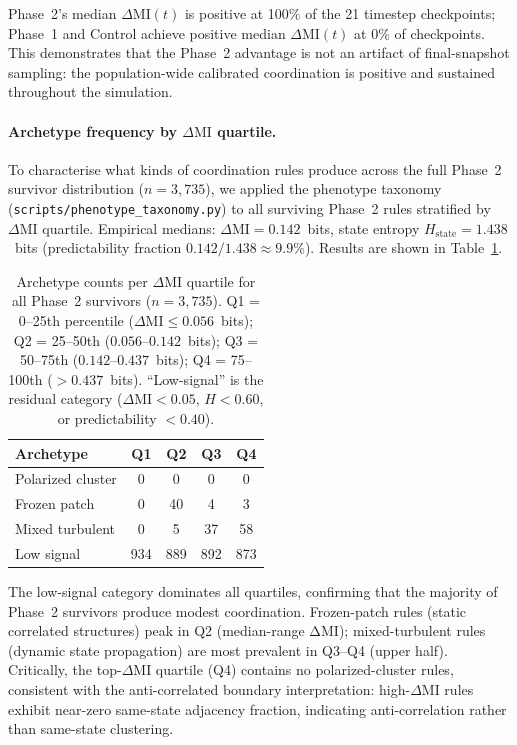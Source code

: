 \documentclass[letterpaper]{article}
\begin{document}
Phase~2's median $\Delta\mathrm{MI}(t)$ is positive at 100\% of the 21
timestep checkpoints; Phase~1 and Control achieve positive median
$\Delta\mathrm{MI}(t)$ at 0\% of checkpoints.  This demonstrates that
the Phase~2 advantage is not an artifact of final-snapshot sampling: the
population-wide calibrated coordination is positive and sustained
throughout the simulation.

\paragraph{Archetype frequency by $\Delta\mathrm{MI}$ quartile.}
To characterise what kinds of coordination rules produce across the full
Phase~2 survivor distribution ($n=3{,}735$), we applied the phenotype
taxonomy (\texttt{scripts/phenotype\_taxonomy.py}) to all surviving
Phase~2 rules stratified by $\Delta\mathrm{MI}$ quartile.
Empirical medians: $\Delta\mathrm{MI} = 0.142$~bits, state entropy
$H_{\mathrm{state}} = 1.438$~bits (predictability fraction
$0.142/1.438 \approx 9.9\%$).  Results are shown in
Table~\ref{tab:archetype_quartiles}.

\begin{table}[htbp]
\centering
\caption{Archetype counts per $\Delta\mathrm{MI}$ quartile for all Phase~2
survivors ($n=3{,}735$). Q1 = 0--25th percentile
($\Delta\mathrm{MI} \leq 0.056$~bits); Q2 = 25--50th ($0.056$--$0.142$~bits);
Q3 = 50--75th ($0.142$--$0.437$~bits); Q4 = 75--100th ($>0.437$~bits).
``Low-signal'' is the residual category ($\Delta\mathrm{MI} < 0.05$,
$H<0.60$, or predictability $< 0.40$).}
\label{tab:archetype_quartiles}
\begin{tabular}{lcccc}
\toprule
Archetype & Q1 & Q2 & Q3 & Q4 \\
\midrule
Polarized cluster  & 0 & 0 & 0 & 0 \\
Frozen patch       & 0 & 40 & 4 & 3 \\
Mixed turbulent    & 0 & 5 & 37 & 58 \\
Low signal         & 934 & 889 & 892 & 873 \\
\bottomrule
\end{tabular}
\end{table}

The low-signal category dominates all quartiles, confirming that the majority
of Phase~2 survivors produce modest coordination.  Frozen-patch rules
(static correlated structures) peak in Q2 (median-range ΔMI);
mixed-turbulent rules (dynamic state propagation) are most prevalent in
Q3--Q4 (upper half).  Critically, the top-$\Delta\mathrm{MI}$ quartile (Q4)
contains no polarized-cluster rules, consistent with the anti-correlated
boundary interpretation: high-$\Delta\mathrm{MI}$ rules exhibit near-zero
same-state adjacency fraction, indicating anti-correlation rather than
same-state clustering.
\end{document}
